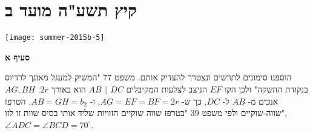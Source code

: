 

\np

\section{קיץ תשע"ה מועד ב}

\begin{center}
\texttt{[image: summer-2015b-5]}
\end{center}

\vspace{-1ex}

\textbf{סעיף א}

הוספנו סימונים לתרשים ונצטרך להצדיק אותם. 
משפט
$77$
"המשיק למעגל מאונך לרדיוס בנקודת ההשקה" ולכן הקו 
$EF$
הניצב לצלעות המקיבלים 
$AB\|DC$
הוא באורך
$2r$.
$AG, BH$
אנכים מ-%
$AB$ 
ל-%
$DC$,
כך ש-%
$AG=EF=BF=2r$,
ו-%
$AB=GH=b_2$.
הטרפז שווה-שוקיים ולפי משפט
$39$
"בטרפז שווה שוקיים הזוויות שליד אותו בסיס שוות זו לזו", 
$\angle ADC=\angle BCD=70^\circ$.

